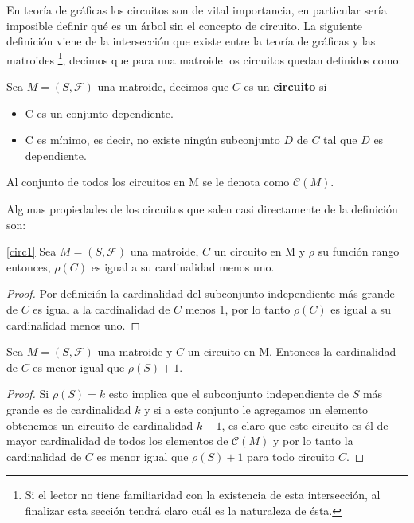 En teoría de gráficas los circuitos son de vital importancia, en particular sería imposible definir qué es un árbol sin el concepto de circuito. La siguiente definición viene de la intersección que existe entre la teoría de gráficas y las matroides \footnote{Si el lector no tiene familiaridad con la existencia de esta intersección, al finalizar esta sección tendrá claro cuál es la naturaleza de ésta.}, decimos que para una matroide los circuitos quedan definidos como: 

\begin{dfn} %
Sea $M=(S,\mathcal{F})$ una matroide, decimos que $C$ es un \textbf{circuito} si 
\begin{itemize}
\item C es un conjunto dependiente. 
\item C es mínimo, es decir, no existe ningún subconjunto $D$ de $C$ tal que $D$ es dependiente.
\end{itemize}
Al conjunto de todos los circuitos en M se le denota como $\mathcal{C}(M)$.
\end{dfn}

Algunas propiedades de los circuitos que salen casi directamente de la definición son: 

\begin{cor} \ref{circ1}
Sea $M=(S,\mathcal{F})$ una matroide, $C$ un circuito en M y $\rho$ su función rango entonces, $\rho(C)$ es igual a su cardinalidad menos uno. 
\end{cor}
\begin{proof}
Por definición la cardinalidad del subconjunto independiente más grande de $C$ es igual a la cardinalidad de $C$ menos 1, por lo tanto $\rho(C)$ es igual a su cardinalidad menos uno.
\end{proof}

\begin{cor}
Sea $M=(S,\mathcal{F})$ una matroide y $C$ un circuito en M. Entonces la cardinalidad de $C$ es menor igual que $\rho(S) + 1$.
\end{cor}

\begin{proof}
Si $\rho(S)=k$ esto implica que el subconjunto independiente de $S$ más grande es de cardinalidad $k$ y si a este conjunto le agregamos un elemento obtenemos un circuito de cardinalidad $k +1$, es claro que este circuito es él de mayor cardinalidad de todos los elementos de $\mathcal{C}(M)$ y por lo tanto la cardinalidad de $C$ es menor igual que $\rho(S) + 1$ para todo circuito $C$.
\end{proof}

